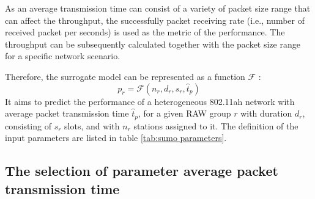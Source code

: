  
 As an average transmission time can
consist of a variety of packet size range that can affect
the throughput, the successfully packet receiving rate (i.e.,
number of received packet per seconds) is used as the metric of the
performance. The throughput can be subsequently calculated
together with the packet size range for a specific network
scenario.
 

 
 





Therefore, the surrogate model can be represented as a function  $\mathcal{F}$ :
\begin{equation} \label{eq:raw_model}
p_r = \mathcal{F}(n_r, d_r, s_r, \hat{t}_p) 
\end{equation}
It aims to predict the performance of a heterogeneous 802.11ah network with average packet transmission time $\hat{t}_p$, for a given RAW group $r$ with duration $d_r$, consisting of $s_r$ slots, and with $n_r$ stations assigned to it. The definition of the input parameters are listed in table \ref{tab:sumo parameters}.

\subsection{The selection of parameter average packet transmission time \label{subsubsec:txselection}}


